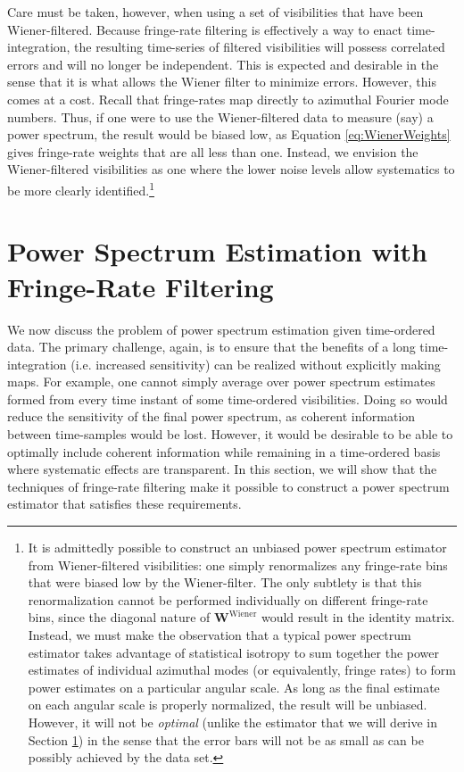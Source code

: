 \documentclass[twocolumn,apj,numberedappendix]{emulateapj}
\begin{document}
Care must be taken, however, when using a set of visibilities that have been Wiener-filtered.  Because fringe-rate filtering is effectively a way to enact time-integration, the resulting time-series of filtered visibilities will possess correlated errors and will no longer be independent.  This is expected and desirable in the sense that it is what allows the Wiener filter to minimize errors.  However, this comes at a cost.  Recall that fringe-rates map directly to azimuthal Fourier mode numbers.  Thus, if one were to use the Wiener-filtered data to measure (say) a power spectrum, the result would be biased low, as Equation \eqref{eq:WienerWeights} gives fringe-rate weights that are all less than one.  Instead, we envision the Wiener-filtered visibilities as one where the lower noise levels allow systematics to be more clearly identified.\footnote{It is admittedly possible to construct an unbiased power spectrum estimator from Wiener-filtered visibilities: one simply renormalizes any fringe-rate bins that were biased low by the Wiener-filter.  The only subtlety is that this renormalization cannot be performed individually on different fringe-rate bins, since the diagonal nature of $\mathbf{W}^\textrm{Wiener}$ would result in the identity matrix.  Instead, we must make the observation that a typical power spectrum estimator takes advantage of statistical isotropy to sum together the power estimates of individual azimuthal modes (or equivalently, fringe rates) to form power estimates on a particular angular scale.  As long as the final estimate on each angular scale is properly normalized, the result will be unbiased.  However, it will not be \emph{optimal} (unlike the estimator that we will derive in Section \ref{sec:OptPower}) in the sense that the error bars will not be as small as can be possibly achieved by the data set.}

\section{Power Spectrum Estimation with Fringe-Rate Filtering}
\label{sec:OptPower}
We now discuss the problem of power spectrum estimation given time-ordered data.  The primary challenge, again, is to ensure that the benefits of a long time-integration (i.e. increased sensitivity) can be realized without explicitly making maps.  For example, one cannot simply average over power spectrum estimates formed from every time instant of some time-ordered visibilities.  Doing so would reduce the sensitivity of the final power spectrum, as coherent information between time-samples would be lost.  However, it would be desirable to be able to optimally include coherent information while remaining in a time-ordered basis where systematic effects are transparent.  In this section, we will show that the techniques of fringe-rate filtering make it possible to construct a power spectrum estimator that satisfies these requirements.
\end{document}
